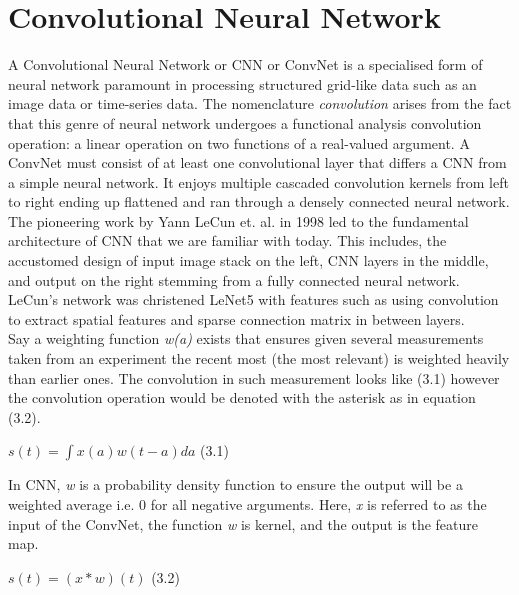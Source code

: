 \vspace{5mm}


\section{Convolutional Neural Network} 

\vspace{5mm}

A Convolutional Neural Network or CNN or ConvNet is a specialised form of neural network paramount in processing structured grid-like data such as an image data or time-series data. The nomenclature {\it convolution} arises from the fact that this genre of neural network undergoes a functional analysis convolution operation: a linear operation on two functions of a real-valued argument. A ConvNet must consist of at least one convolutional layer that differs a CNN from a simple neural network. It enjoys multiple cascaded convolution kernels from left to right ending up flattened and ran through a densely connected neural network. The pioneering work by Yann LeCun et. al. in 1998 led to the fundamental architecture of CNN that we are familiar with today. This includes, the accustomed design of input image stack on the left, CNN layers in the middle, and output on the right stemming from a fully connected neural network. LeCun's network was christened LeNet5 with features such as using convolution to extract spatial features and sparse connection matrix in between layers. \citep{leCun}\\

Say a weighting function {\it w(a)} exists that ensures given several measurements taken from an experiment the recent most (the most relevant) is weighted heavily than earlier ones. The convolution in such measurement looks like (3.1) however the convolution operation would be denoted with the asterisk as in equation (3.2).

\vspace{7mm}
\hspace{52mm} $s(t) = \displaystyle\int x(a) w(t-a) da$ \hspace*{0pt}\hfill (3.1) 
\vspace{7mm}

In CNN, {\it w} is a probability density function to ensure the output will be a weighted average i.e. 0 for all negative arguments. Here, {\it x} is referred to as the input of the ConvNet, the function {\it w} is kernel, and the output is the feature map. 

\vspace{7mm}
\hspace{58mm} $s(t) = \left(x* w\right) (t)$ \hspace*{0pt}\hfill (3.2) 
\vspace{7mm}


